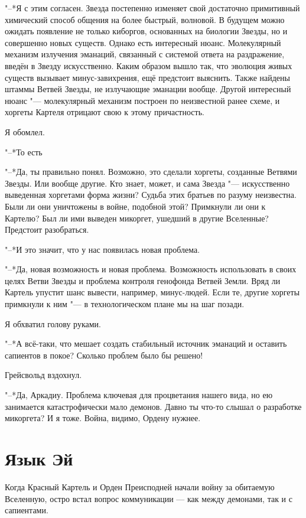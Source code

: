 \documentclass[a4paper,10pt]{book}
\newcommand{\ldotsq}{\so{?\hbox{\hspace{-.212em}}..}\xspace}
\begin{document}
"--*Я с этим согласен. Звезда постепенно изменяет свой достаточно примитивный 
химический способ общения на более быстрый, волновой. В будущем можно ожидать
появление не только киборгов, основанных на биологии Звезды, но и совершенно 
новых существ. Однако есть интересный нюанс. 
Молекулярный механизм излучения эманаций, 
связанный с системой ответа на раздражение, введён в Звезду искусственно. 
Каким образом вышло так, что эволюция живых существ вызывает минус-завихрения, 
ещё предстоит выяснить. Также найдены штаммы Ветвей Звезды, не излучающие 
эманации вообще. Другой интересный нюанс "--- молекулярный механизм построен по 
неизвестной ранее схеме, и хоргеты Картеля отрицают свою к этому причастность.

Я обомлел.

"--*То есть\ldotsq

"--*Да, ты правильно понял. Возможно, это сделали хоргеты, созданные Ветвями 
Звезды. Или вообще другие. Кто знает, может, и сама Звезда "--- искусственно 
выведенная хоргетами форма жизни? Судьба этих братьев по разуму неизвестна. 
Были ли они уничтожены в войне, подобной этой? Примкнули ли они к Картелю? Был 
ли ими выведен микоргет, ушедший в другие Вселенные? Предстоит разобраться.

"--*И это значит, что у нас появилась новая проблема.

"--*Да, новая возможность и новая проблема. Возможность использовать в своих 
целях Ветви Звезды и проблема контроля генофонда Ветвей Земли. Вряд ли Картель 
упустит шанс вывести, например, минус-людей. Если те, другие хоргеты примкнули 
к ним "--- в технологическом плане мы на шаг позади.

Я обхватил голову руками.

"--*А всё-таки, что мешает создать стабильный источник эманаций и оставить 
сапиентов в покое? Сколько проблем было бы решено!

Грейсвольд вздохнул.

"--*Да, Аркадиу. Проблема ключевая для процветания нашего вида, но ею 
занимается катастрофически мало демонов. Давно ты что-то слышал о разработке 
микоргета? И я тоже. Война, видимо, Ордену нужнее.


\section{Язык Эй}

Когда Красный Картель и Орден Преисподней начали войну за обитаемую Вселенную, 
остро встал вопрос коммуникации --- как между демонами, так и с сапиентами.
\end{document}
